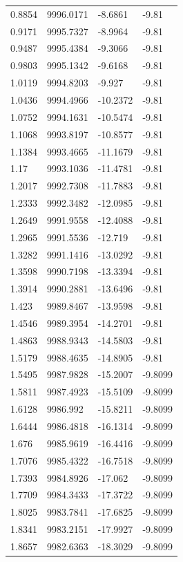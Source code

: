 \begin{table}[H]
\begin{tabular}{llll}
0.8854 & 9996.0171 & -8.6861 & -9.81 \\
0.9171 & 9995.7327 & -8.9964 & -9.81 \\
0.9487 & 9995.4384 & -9.3066 & -9.81 \\
0.9803 & 9995.1342 & -9.6168 & -9.81 \\
1.0119 & 9994.8203 & -9.927 & -9.81 \\
1.0436 & 9994.4966 & -10.2372 & -9.81 \\
1.0752 & 9994.1631 & -10.5474 & -9.81 \\
1.1068 & 9993.8197 & -10.8577 & -9.81 \\
1.1384 & 9993.4665 & -11.1679 & -9.81 \\
1.17 & 9993.1036 & -11.4781 & -9.81 \\
1.2017 & 9992.7308 & -11.7883 & -9.81 \\
1.2333 & 9992.3482 & -12.0985 & -9.81 \\
1.2649 & 9991.9558 & -12.4088 & -9.81 \\
1.2965 & 9991.5536 & -12.719 & -9.81 \\
1.3282 & 9991.1416 & -13.0292 & -9.81 \\
1.3598 & 9990.7198 & -13.3394 & -9.81 \\
1.3914 & 9990.2881 & -13.6496 & -9.81 \\
1.423 & 9989.8467 & -13.9598 & -9.81 \\
1.4546 & 9989.3954 & -14.2701 & -9.81 \\
1.4863 & 9988.9343 & -14.5803 & -9.81 \\
1.5179 & 9988.4635 & -14.8905 & -9.81 \\
1.5495 & 9987.9828 & -15.2007 & -9.8099 \\
1.5811 & 9987.4923 & -15.5109 & -9.8099 \\
1.6128 & 9986.992 & -15.8211 & -9.8099 \\
1.6444 & 9986.4818 & -16.1314 & -9.8099 \\
1.676 & 9985.9619 & -16.4416 & -9.8099 \\
1.7076 & 9985.4322 & -16.7518 & -9.8099 \\
1.7393 & 9984.8926 & -17.062 & -9.8099 \\
1.7709 & 9984.3433 & -17.3722 & -9.8099 \\
1.8025 & 9983.7841 & -17.6825 & -9.8099 \\
1.8341 & 9983.2151 & -17.9927 & -9.8099 \\
1.8657 & 9982.6363 & -18.3029 & -9.8099 \\

\end{tabular}
\end{table}
